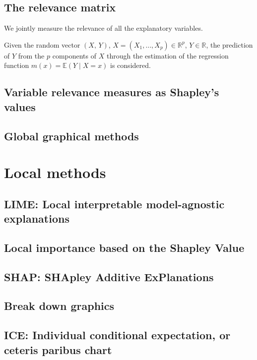 \subsection{The relevance matrix}

We jointly measure the relevance of all the explanatory variables.

Given the random vector $(X,\,Y)$, $X = (X_1,\ldots,X_p) \in \mathds{R}^p$,
$Y \in \mathds{R}$, the prediction of $Y$ from the $p$ components of
$X$ through  the estimation of the regression function
$m(x) = \mathds{E}(Y \mid X = x)$ is considered.


\subsection{Variable relevance measures as Shapley’s values}
\subsection{Global graphical methods}


\section{Local methods}

\subsection{LIME: Local interpretable model-agnostic explanations}
\subsection{Local importance based on the Shapley Value}
\subsection{SHAP: SHApley Additive ExPlanations}
\subsection{Break down graphics}
\subsection{ICE: Individual conditional expectation, or ceteris paribus chart}

